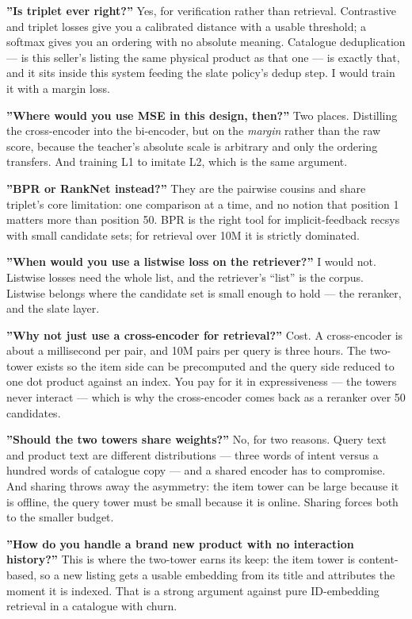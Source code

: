 \documentclass[10pt,twoside]{book}
\begin{document}
\textbf{''Is triplet ever right?''} Yes, for verification rather than retrieval. Contrastive and triplet losses give you a calibrated distance with a usable threshold; a softmax gives you an ordering with no absolute meaning. Catalogue deduplication --- is this seller's listing the same physical product as that one --- is exactly that, and it sits inside this system feeding the slate policy's dedup step. I would train it with a margin loss.\par
\textbf{''Where would you use MSE in this design, then?''} Two places. Distilling the cross-encoder into the bi-encoder, but on the \textit{margin} rather than the raw score, because the teacher's absolute scale is arbitrary and only the ordering transfers. And training L1 to imitate L2, which is the same argument.\par
\textbf{''BPR or RankNet instead?''} They are the pairwise cousins and share triplet's core limitation: one comparison at a time, and no notion that position 1 matters more than position 50. BPR is the right tool for implicit-feedback recsys with small candidate sets; for retrieval over 10M it is strictly dominated.\par
\textbf{''When would you use a listwise loss on the retriever?''} I would not. Listwise losses need the whole list, and the retriever's ``list'' is the corpus. Listwise belongs where the candidate set is small enough to hold --- the reranker, and the slate layer.\par
\textbf{''Why not just use a cross-encoder for retrieval?''} Cost. A cross-encoder is about a millisecond per pair, and 10M pairs per query is three hours. The two-tower exists so the item side can be precomputed and the query side reduced to one dot product against an index. You pay for it in expressiveness --- the towers never interact --- which is why the cross-encoder comes back as a reranker over 50 candidates.\par
\textbf{''Should the two towers share weights?''} No, for two reasons. Query text and product text are different distributions --- three words of intent versus a hundred words of catalogue copy --- and a shared encoder has to compromise. And sharing throws away the asymmetry: the item tower can be large because it is offline, the query tower must be small because it is online. Sharing forces both to the smaller budget.\par
\textbf{''How do you handle a brand new product with no interaction history?''} This is where the two-tower earns its keep: the item tower is content-based, so a new listing gets a usable embedding from its title and attributes the moment it is indexed. That is a strong argument against pure ID-embedding retrieval in a catalogue with churn.\par
\end{document}
